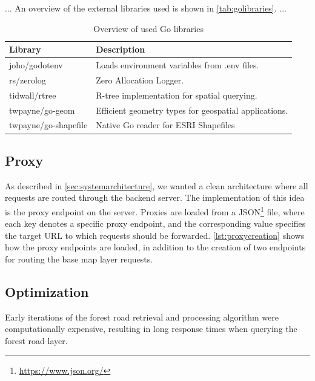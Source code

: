 ... An overview of the external libraries used is shown in \autoref{tab:golibraries}. ...

\begin{table}[h]
    \centering
    \begin{tabular}{|l|l|}
        \hline
        \textbf{Library} & \textbf{Description} \\
        \hline
        joho/godotenv & Loads environment variables from .env files. \\
        rs/zerolog & Zero Allocation Logger. \\
        tidwall/rtree & R-tree implementation for spatial querying. \\
        twpayne/go-geom & Efficient geometry types for geospatial applications. \\
        twpayne/go-shapefile & Native Go reader for ESRI Shapefiles \\
        \hline
    \end{tabular}
    \caption{Overview of used Go libraries}
    \label{tab:golibraries}
\end{table}

\subsection{Proxy}\label{subsec:server:proxy}

As described in \autoref{sec:systemarchitecture}, we wanted a clean architecture where all requests are routed through the backend server. The implementation of this idea is the proxy endpoint on the server. Proxies are loaded from a JSON\footnote{\url{https://www.json.org/}} file, where each key denotes a specific proxy endpoint, and the corresponding value specifies the target URL to which requests should be forwarded. \autoref{lst:proxycreation} shows how the proxy endpoints are loaded, in addition to the creation of two endpoints for routing the base map layer requests. 

\begin{figure}[h]

\end{figure}

\subsection{Optimization}\label{subsec:server:optimization}

Early iterations of the forest road retrieval and processing algorithm were computationally expensive, resulting in long response times when querying the forest road layer.

